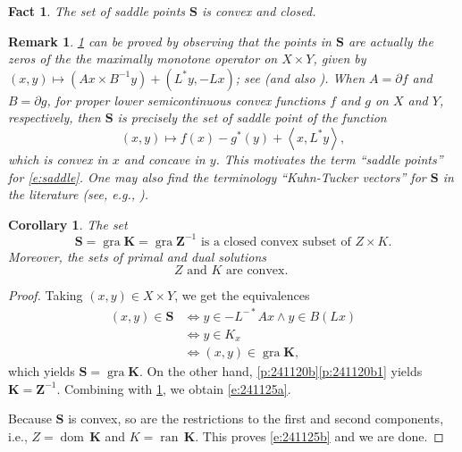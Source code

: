 \documentclass{article}
\providecommand{\siff}{\Leftrightarrow}
\newcommand{\scal}[2]{\left\langle{#1},{#2}  \right\rangle}
\newcommand{\dom}{\ensuremath{\operatorname{dom}}\,}
\newcommand{\ran}{\ensuremath{{\operatorname{ran}}\,}}
\newcommand{\bK}{\ensuremath{{\mathbf{K}}}}
\newcommand{\bKT}{\ensuremath{{\mathbf{S}}}}
\newcommand{\bZ}{\ensuremath{{\mathbf{Z}}}}
\newtheorem{corollary}[theorem]{Corollary}
\newtheorem{fact}[theorem]{Fact}
\newtheorem{remark}[theorem]{Remark}
\providecommand{\gra}{\operatorname{gra}}
\begin{document}
\label{s:saddle}


\begin{fact} 
\label{f:saddle}
The set of saddle points $\bKT$ is convex and closed. 
\end{fact}

\begin{remark}
\label{r:saddle}
\cref{f:saddle} can be proved by observing that the points in $\bKT$ are actually 
the zeros of the 
the maximally monotone operator on $X\times Y$, given by 
$(x,y)\mapsto (Ax\times B^{-1}y) + (L^*y,-Lx)$; 
see \cite[Proposition~2]{EF} (and also \cite[Proposition~26.33]{BC2017}). 
When $A=\partial f$ and $B = \partial g$, for proper 
lower semicontinuous convex functions $f$ and $g$ on 
$X$ and $Y$, respectively, then $\bKT$ is precisely the set of saddle point of the function
\begin{equation}
(x,y)\mapsto 
f(x)-g^*(y)+\scal{x}{L^*y}, 
\end{equation}
which is convex in $x$ and concave in $y$. 
This motivates the term ``saddle points'' for \cref{e:saddle}. 
One may also find the terminology ``Kuhn-Tucker vectors'' for $\bKT$ 
in the literature (see, e.g., \cite{Rockafellar}). 
\end{remark}







\begin{corollary}
\label{p:241120d}
The set 
\begin{equation}
\label{e:241125a}
\text{$\bKT = \gra \bK = \gra \bZ^{-1}$ is a closed convex subset of $Z\times K$.
}
\end{equation}
Moreover, the sets of primal and dual solutions 
\begin{equation}
\label{e:241125b}
\text{
$Z$ and $K$ are convex. 
}
\end{equation}
\end{corollary}
\begin{proof}
Taking $(x,y)\in X\times Y$, we get the equivalences
\begin{subequations}
\begin{align}
(x,y)\in \bKT
&\siff
y\in -L^{-*}Ax \land y \in B(Lx)\\
&\siff 
y \in K_x\\
&\siff (x,y)\in\gra \bK, 
\end{align}
\end{subequations}
which yields $\bKT = \gra  \bK$. 
On the other hand, \cref{p:241120b}\cref{p:241120b1} yields 
$\bK = \bZ^{-1}$.
Combining with \cref{f:saddle}, we obtain \cref{e:241125a}.

Because $\bKT$ is convex, so are the restrictions to 
the first and second components, i.e., $Z=\dom\bK$ and $K=\ran\bK$.
This proves \cref{e:241125b} and we are done. 
\end{proof}
\end{document}
